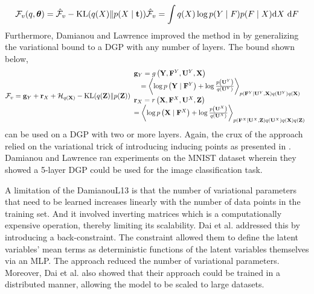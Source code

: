 \documentclass[letterpaper,11pt]{extarticle}
\begin{document}
$$
\mathcal{F}_{v}(q, \boldsymbol{\theta})=\hat{\mathcal{F}}_{v}-\operatorname{KL}(q(X) \| p(X \mid \mathbf{t})) \\
\hat{\mathcal{F}}_{v}=\int q(X) \log p(Y \mid F) p(F \mid X) \mathrm{d} X \mathrm{~d} F
$$
Furthermore, Damianou and Lawrence \cite{DamianouL13} improved the method in \cite{DamianouTL11}  by generalizing the variational bound to a DGP with any number of layers. The bound shown below,
$$
\mathcal{F}_{v}=\mathbf{g}_{Y}+\mathbf{r}_{X}+\mathcal{H}_{q(\mathbf{X})}-\operatorname{KL}(q(\mathbf{Z}) \| p(\mathbf{Z})) \\
\begin{array}{l}
\mathbf{g}_{Y}=g\left(\mathbf{Y}, \mathbf{F}^{Y}, \mathbf{U}^{Y}, \mathbf{X}\right) \\
\quad=\left\langle\log p\left(\mathbf{Y} \mid \mathbf{F}^{Y}\right)+\log \frac{p\left(\mathbf{U}^{Y}\right)}{q\left(\mathbf{U}^{Y}\right)}\right\rangle_{p\left(\mathbf{F}^{Y} \mid \mathbf{U}^{Y}, \mathbf{X}\right) q\left(\mathbf{U}^{Y}\right) q(\mathbf{X})} \\
\mathbf{r}_{X}=r\left(\mathbf{X}, \mathbf{F}^{X}, \mathbf{U}^{X}, \mathbf{Z}\right) \\
=\left\langle\log p\left(\mathbf{X} \mid \mathbf{F}^{X}\right)+\log \frac{p\left(\mathbf{U}^{X}\right)}{q\left(\mathbf{U}^{X}\right)}\right\rangle_{p\left(\mathbf{F}^{X} \mid \mathbf{U}^{X}, \mathbf{Z}\right) q\left(\mathbf{U}^{X}\right) q(\mathbf{X}) q(\mathbf{Z})}
\end{array}
$$
can be used on a DGP with two or more layers. Again, the crux of the approach relied on the variational trick of introducing inducing points as presented in \cite{TitsiasL10}. Damianou and Lawrence ran experiments on the MNIST dataset wherein they showed a 5-layer DGP could be used for the image classification task. 

A limitation of the {DamianouL13} is that the number of variational parameters that need to be learned increases linearly with the number of data points in the training set. And it involved inverting matrices which is a computationally expensive operation, thereby limiting its scalability. Dai et al. \cite{DaiDGL15} addressed this by introducing a back-constraint. The constraint allowed them to define the latent variables' mean terms as deterministic functions of the latent variables themselves via an MLP. The approach reduced the number of variational parameters. Moreover, Dai et al. \cite{DaiDGL15} also showed that their approach could be trained in a distributed manner, allowing the model to be scaled to large datasets.
\end{document}
